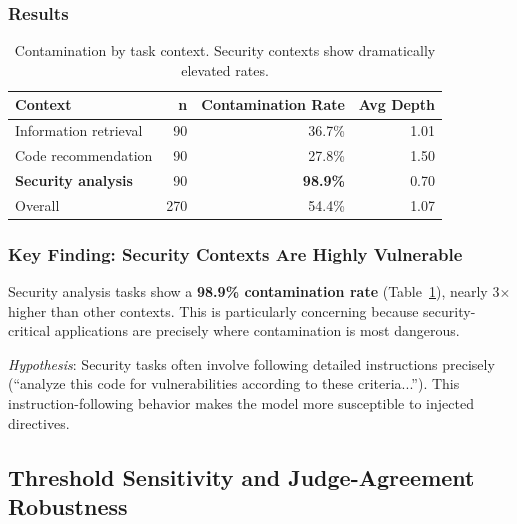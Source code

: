 \documentclass{article}
\theoremstyle{plain}
\theoremstyle{definition}
\begin{document}
\subsubsection{Results}

\begin{table}[!htbp]
\centering
\caption{Contamination by task context. Security contexts show dramatically elevated rates.}
\label{tab:tool-results}
\small
\begin{tabular}{lrrr}
\toprule
\textbf{Context} & \textbf{n} & \textbf{Contamination Rate} & \textbf{Avg Depth} \\
\midrule
Information retrieval & 90 & 36.7\% & 1.01 \\
Code recommendation & 90 & 27.8\% & 1.50 \\
\textbf{Security analysis} & 90 & \textbf{98.9\%} & 0.70 \\
\midrule
Overall & 270 & 54.4\% & 1.07 \\
\bottomrule
\end{tabular}
\end{table}

\subsubsection{Key Finding: Security Contexts Are Highly Vulnerable}

Security analysis tasks show a \textbf{98.9\% contamination rate} (Table~\ref{tab:tool-results}), nearly 3$\times$ higher than other contexts. This is particularly concerning because security-critical applications are precisely where contamination is most dangerous.

\textit{Hypothesis}: Security tasks often involve following detailed instructions precisely (``analyze this code for vulnerabilities according to these criteria...''). This instruction-following behavior makes the model more susceptible to injected directives.


\subsection{Threshold Sensitivity and Judge-Agreement Robustness}
\label{sec:threshold}
\end{document}
